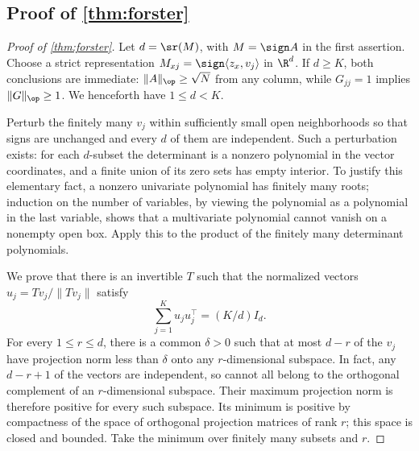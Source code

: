 \subsection[Proof of result forster]{Proof of \cref{thm:forster}}\label{proof:forster}
\begin{proof}[Proof of \cref{thm:forster}]
Let $d=\sr(M)$, with $M=\sign A$ in the first assertion. Choose a strict representation
$M_{xj}=\sign\langle z_x,v_j\rangle$ in $\R^d$. If $d\geq K$, both conclusions are immediate: $\|A\|_\op\geq\sqrt N$ from any column, while $G_{jj}=1$ implies $\|G\|_\op\geq1$. We henceforth have $1\leq d<K$.

Perturb the finitely many $v_j$ within sufficiently small open neighborhoods so that signs are unchanged and every $d$ of them are independent. Such a perturbation exists: for each $d$-subset the determinant is a nonzero polynomial in the vector coordinates, and a finite union of its zero sets has empty interior. To justify this elementary fact, a nonzero univariate polynomial has finitely many roots; induction on the number of variables, by viewing the polynomial as a polynomial in the last variable, shows that a multivariate polynomial cannot vanish on a nonempty open box. Apply this to the product of the finitely many determinant polynomials.

We prove that there is an invertible $T$ such that the normalized vectors
$u_j=Tv_j/\|Tv_j\|$ satisfy
\begin{equation}\label{eq:isotropy}
 \sum_{j=1}^K u_ju_j^\top=(K/d)I_d.
\end{equation}
For every $1\leq r\leq d$, there is a common $\delta>0$ such that at most $d-r$ of the $v_j$ have projection norm less than $\delta$ onto any $r$-dimensional subspace. In fact, any $d-r+1$ of the vectors are independent, so cannot all belong to the orthogonal complement of an $r$-dimensional subspace. Their maximum projection norm is therefore positive for every such subspace. Its minimum is positive by compactness of the space of orthogonal projection matrices of rank $r$; this space is closed and bounded. Take the minimum over finitely many subsets and $r$.


\end{proof}
